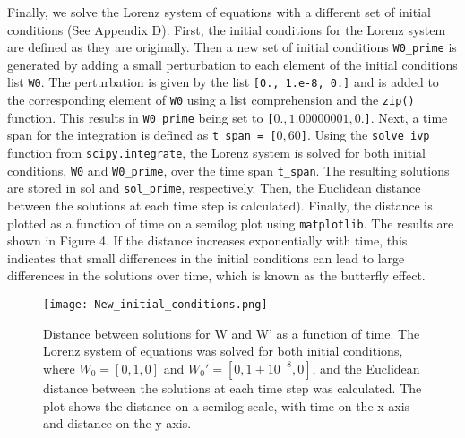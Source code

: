 \documentclass[letterpaper,10.9pt]{article}
\begin{document}
Finally, we solve the Lorenz system of equations with a different set of initial conditions (See Appendix D). First, the initial conditions for the Lorenz system are defined as they are originally. Then a new set of initial conditions \texttt{W0\_prime} is generated by adding a small perturbation to each element of the initial conditions list \texttt{W0}. The perturbation is given by the list \texttt{[0., 1.e-8, 0.]} and is added to the corresponding element of \texttt{W0} using a list comprehension and the \texttt{zip()} function. This results in \texttt{W0\_prime} being set to \texttt{[$0., 1.00000001, 0.$]}. Next, a time span for the integration is defined as \texttt{t\_span = [$0, 60$]}. Using the \texttt{solve\_ivp} function from \texttt{scipy.integrate}, the Lorenz system is solved for both initial conditions, \texttt{W0} and \texttt{W0\_prime}, over the time span \texttt{t\_span}. The resulting solutions are stored in sol and \texttt{sol\_prime}, respectively. Then, the Euclidean distance between the solutions at each time step is calculated). Finally, the distance is plotted as a function of time on a semilog plot using \texttt{matplotlib}. The results are shown in Figure 4. If the distance increases exponentially with time, this indicates that small differences in the initial conditions can lead to large differences in the solutions over time, which is known as the butterfly effect.

\begin{figure}[H]
  \centering
  \texttt{[image: New\_initial\_conditions.png]}
  \caption{Distance between solutions for W and W' as a function of time. The Lorenz system of equations was solved for both initial conditions, where $W_0=[0,1,0]$ and $W_0'=[0,1+10^{-8},0]$, and the Euclidean distance between the solutions at each time step was calculated. The plot shows the distance on a semilog scale, with time on the x-axis and distance on the y-axis.}
  \label{fig:label}
\end{figure}



\pagebreak
\end{document}
